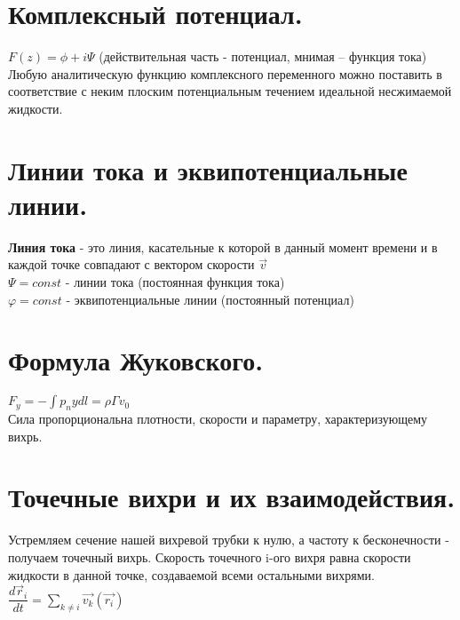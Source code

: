 \begin{multicols*}{2}
		\section{Комплексный потенциал.}
		$F(z)=\phi+i\Psi$ (действительная часть - потенциал, мнимая – функция тока)\\
		Любую аналитическую функцию комплексного переменного можно поставить в соответствие с неким плоским потенциальным течением идеальной несжимаемой жидкости.
		
		\section{Линии тока и эквипотенциальные линии.}
		\textbf{Линия тока} - это линия, касательные к которой в данный момент времени и
		в каждой точке совпадают с вектором скорости  $\vec{v}$ \\
		$\Psi = const$ - линии тока (постоянная функция тока) \\
		$\varphi = const$ - эквипотенциальные линии (постоянный потенциал)
		
		\section{Формула Жуковского.}
		$F_y=-\int p_nydl=\rho\Gamma v_0$\\
		Сила пропорциональна плотности, скорости и параметру, характеризующему вихрь.
		
		\section{Точечные вихри и их взаимодействия.}
		Устремляем сечение нашей вихревой трубки к нулю, а частоту к бесконечности - получаем точечный вихрь. Скорость точечного i-ого вихря равна скорости жидкости в данной точке, создаваемой всеми остальными вихрями.\\
		$\dfrac{d\vec{r}_i }{dt} = \sum\limits_{k\neq i}{\vec{v_k}(\vec{r_i})}$
		

\end{multicols*}
